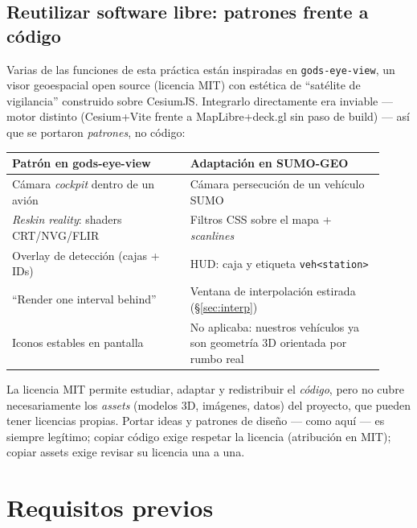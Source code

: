 \documentclass[11pt,a4paper]{article}
\begin{document}
\subsection{Reutilizar software libre: patrones frente a código}
\label{sec:mit}

Varias de las funciones de esta práctica están inspiradas en
\texttt{gods-eye-view}, un visor geoespacial open source (licencia MIT) con
estética de ``satélite de vigilancia'' construido sobre CesiumJS. Integrarlo
directamente era inviable --- motor distinto (Cesium+Vite frente a
MapLibre+deck.gl sin paso de build) --- así que se portaron \emph{patrones},
no código:

\begin{center}\small
\begin{tabular}{@{}p{0.44\linewidth}p{0.48\linewidth}@{}}
\toprule
\textbf{Patrón en gods-eye-view} & \textbf{Adaptación en SUMO-GEO} \\
\midrule
Cámara \emph{cockpit} dentro de un avión & Cámara persecución de un vehículo SUMO \\
\emph{Reskin reality}: shaders CRT/NVG/FLIR & Filtros CSS sobre el mapa + \emph{scanlines} \\
Overlay de detección (cajas + IDs) & HUD: caja y etiqueta \texttt{veh<station>} \\
``Render one interval behind'' & Ventana de interpolación estirada (\S\ref{sec:interp}) \\
Iconos estables en pantalla & No aplicaba: nuestros vehículos ya son geometría 3D orientada por rumbo real \\
\bottomrule
\end{tabular}
\end{center}

\begin{notabox}
La licencia MIT permite estudiar, adaptar y redistribuir el \emph{código},
pero no cubre necesariamente los \emph{assets} (modelos 3D, imágenes, datos)
del proyecto, que pueden tener licencias propias. Portar ideas y patrones de
diseño --- como aquí --- es siempre legítimo; copiar código exige respetar la
licencia (atribución en MIT); copiar assets exige revisar su licencia una a
una.
\end{notabox}

\section{Requisitos previos}
\end{document}
